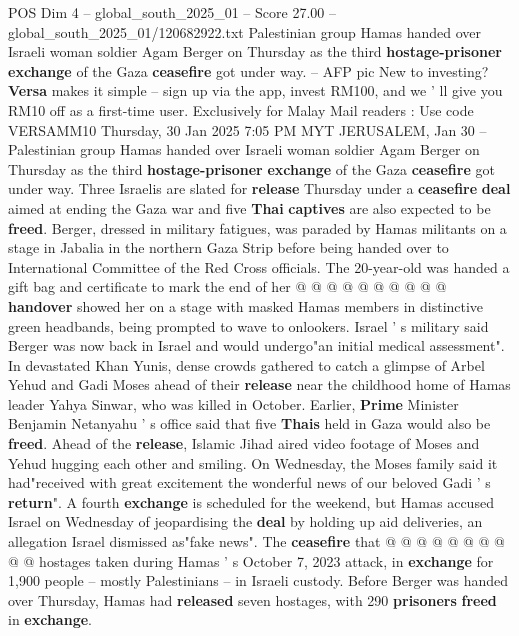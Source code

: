 \begin{textsample}{POS Dim 4 – global\_south\_2025\_01 – Score 27.00 – global\_south\_2025\_01/120682922.txt}  \label{ex:f4_pos_013}
Palestinian group Hamas handed over Israeli woman soldier Agam Berger on Thursday as the third \textbf{hostage-prisoner} \textbf{exchange} of the Gaza \textbf{ceasefire} got under way. -- AFP pic New to investing? \textbf{Versa} makes it simple -- sign up via the app, invest RM100, and we ' ll give you RM10 off as a first-time user.
Exclusively for Malay Mail readers : Use code VERSAMM10 Thursday, 30 Jan 2025 7:05 PM MYT JERUSALEM, Jan 30 -- Palestinian group Hamas handed over Israeli woman soldier Agam Berger on Thursday as the third \textbf{hostage-prisoner} \textbf{exchange} of the Gaza \textbf{ceasefire} got under way.
Three Israelis are slated for \textbf{release} Thursday under a \textbf{ceasefire} \textbf{deal} aimed at ending the Gaza war and five \textbf{Thai} \textbf{captives} are also expected to be \textbf{freed}.
Berger, dressed in military fatigues, was paraded by Hamas militants on a stage in Jabalia in the northern Gaza Strip before being handed over to International Committee of the Red Cross officials.
The 20-year-old was handed a gift bag and certificate to mark the end of her @ @ @ @ @ @ @ @ @ @ \textbf{handover} showed her on a stage with masked Hamas members in distinctive green headbands, being prompted to wave to onlookers.
Israel ' s military said Berger was now back in Israel and would undergo"an initial medical assessment".
In devastated Khan Yunis, dense crowds gathered to catch a glimpse of Arbel Yehud and Gadi Moses ahead of their \textbf{release} near the childhood home of Hamas leader Yahya Sinwar, who was killed in October.
Earlier, \textbf{Prime} Minister Benjamin Netanyahu ' s office said that five \textbf{Thais} held in Gaza would also be \textbf{freed}.
Ahead of the \textbf{release}, Islamic Jihad aired video footage of Moses and Yehud hugging each other and smiling.
On Wednesday, the Moses family said it had"received with great excitement the wonderful news of our beloved Gadi ' s \textbf{return}".
A fourth \textbf{exchange} is scheduled for the weekend, but Hamas accused Israel on Wednesday of jeopardising the \textbf{deal} by holding up aid deliveries, an allegation Israel dismissed as"fake news".
The \textbf{ceasefire} that @ @ @ @ @ @ @ @ @ @ hostages taken during Hamas ' s October 7, 2023 attack, in \textbf{exchange} for 1,900 people -- mostly Palestinians -- in Israeli custody.
Before Berger was handed over Thursday, Hamas had \textbf{released} seven hostages, with 290 \textbf{prisoners} \textbf{freed} in \textbf{exchange}.

\end{textsample}
